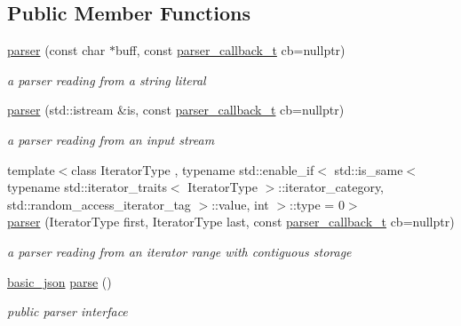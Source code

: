 \subsection*{Public Member Functions}
\begin{DoxyCompactItemize}
\item 
\hyperlink{classnlohmann_1_1basic__json_1_1parser_aac563319f4df894ab542a2b6d19209ae}{parser} (const char $\ast$buff, const \hyperlink{classnlohmann_1_1basic__json_aecae491e175f8767c550ae3c59e180e3}{parser\+\_\+callback\+\_\+t} cb=nullptr)
\begin{DoxyCompactList}\small\item\em a parser reading from a string literal \end{DoxyCompactList}\item 
\hyperlink{classnlohmann_1_1basic__json_1_1parser_a2fb8e838d9d27dd7fc0dc3f7935a0ad8}{parser} (std\+::istream \&is, const \hyperlink{classnlohmann_1_1basic__json_aecae491e175f8767c550ae3c59e180e3}{parser\+\_\+callback\+\_\+t} cb=nullptr)
\begin{DoxyCompactList}\small\item\em a parser reading from an input stream \end{DoxyCompactList}\item 
{\footnotesize template$<$class Iterator\+Type , typename std\+::enable\+\_\+if$<$ std\+::is\+\_\+same$<$ typename std\+::iterator\+\_\+traits$<$ Iterator\+Type $>$\+::iterator\+\_\+category, std\+::random\+\_\+access\+\_\+iterator\+\_\+tag $>$\+::value, int $>$\+::type  = 0$>$ }\\\hyperlink{classnlohmann_1_1basic__json_1_1parser_a25e0dba43264cb2e57beba2d5757f9f0}{parser} (Iterator\+Type first, Iterator\+Type last, const \hyperlink{classnlohmann_1_1basic__json_aecae491e175f8767c550ae3c59e180e3}{parser\+\_\+callback\+\_\+t} cb=nullptr)
\begin{DoxyCompactList}\small\item\em a parser reading from an iterator range with contiguous storage \end{DoxyCompactList}\item 
\hyperlink{classnlohmann_1_1basic__json}{basic\+\_\+json} \hyperlink{classnlohmann_1_1basic__json_1_1parser_ad93c24f1a1b0ac2f557e6ea34deffd63}{parse} ()
\begin{DoxyCompactList}\small\item\em public parser interface \end{DoxyCompactList}\end{DoxyCompactItemize}
